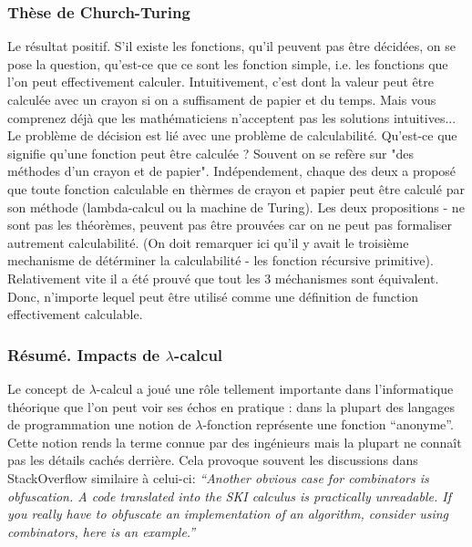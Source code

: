 \documentclass[12pt, a4paper]{article}
\begin{document}
\subsubsection*{Thèse de Church-Turing}
Le résultat positif.
S'il existe les fonctions, qu'il peuvent pas être décidées, on se pose la question, qu'est-ce que ce sont les fonction simple, i.e. les fonctions que l'on peut effectivement calculer.
Intuitivement, c'est dont la valeur peut être calculée avec un crayon si on a suffisament de papier et du temps.
Mais vous comprenez déjà que les mathématiciens n'acceptent pas les solutions intuitives...
Le problème de décision est lié avec une problème de calculabilité. Qu'est-ce que signifie qu'une fonction peut être calculée ? Souvent on se refère sur "des méthodes d'un crayon et de papier". Indépendement, chaque des deux a proposé que toute fonction calculable en thèrmes de crayon et papier peut être calculé par son méthode (lambda-calcul ou la machine de Turing). Les deux propositions - ne sont pas les théorèmes, peuvent pas être prouvées car on ne peut pas formaliser autrement calculabilité. (On doit remarquer ici qu'il y avait le troisième mechanisme de détérminer la calculabilité - les fonction récursive primitive). Relativement vite il a été prouvé que tout les 3 méchanismes sont équivalent. Donc, n'importe lequel peut être utilisé comme une définition de function effectivement calculable.

\subsubsection*{Résumé. Impacts de $\lambda$-calcul}
Le concept de $\lambda$-calcul a joué une rôle tellement importante dans l'informatique théorique que l'on peut voir ses échos en pratique : dans la plupart des langages de programmation une notion de $\lambda$-fonction représente une fonction ``anonyme''.
Cette notion rends la terme connue par des ingénieurs mais la plupart ne connaît pas les détails cachés derrière.
Cela provoque souvent les discussions dans StackOverflow similaire à celui-ci:
\textit{``Another obvious case for combinators is obfuscation. A code translated into the SKI calculus is practically unreadable. If you really have to obfuscate an implementation of an algorithm, consider using combinators, here is an example.''}
\end{document}
